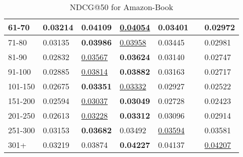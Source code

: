 \begin{table*}[]
\begin{tabular}{|l|l|l|l|l|l|l|}
        61-70   & 0.03214                        & \textbf{0.04109}               & \underline{0.04054}            & 0.03401                        &                                & 0.02972                               \\ \hline
        71-80   & 0.03135                        & \textbf{0.03986}               & \underline{0.03958}            & 0.03445                        &                                & 0.02981                               \\ \hline
        81-90   & 0.02832                        & \underline{0.03567}            & \textbf{0.03624}               & 0.03140                        &                                & 0.02747                               \\ \hline
        91-100  & 0.02885                        & \underline{0.03814}            & \textbf{0.03882}               & 0.03163                        &                                & 0.02717                               \\ \hline
        101-150 & 0.02675                        & \textbf{0.03351}               & \underline{0.03332}            & 0.02927                        &                                & 0.02522                               \\ \hline
        151-200 & 0.02594                        & \underline{0.03037}            & \textbf{0.03049}               & 0.02728                        &                                & 0.02423                               \\ \hline
        201-250 & 0.02613                        & \underline{0.03228}            & \textbf{0.03312}               & 0.03096                        &                                & 0.02914                               \\ \hline
        251-300 & 0.03153                        & \textbf{0.03682}               & 0.03492                        & \underline{0.03594}            &                                & 0.03581                               \\ \hline
        301+    & 0.03219                        & 0.03874                        & \textbf{0.04227}               & 0.04137             &                                & \underline{0.04207}                               \\ \hline
    \end{tabular}
    \caption{NDCG@50 for Amazon-Book}
\end{table*}

